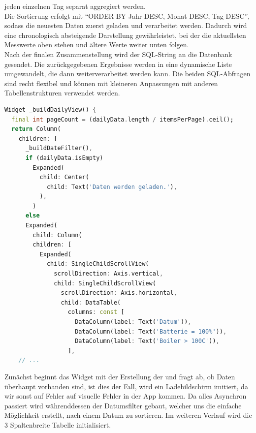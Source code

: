 \documentclass[11pt]{scrartcl}
\begin{document}
    jeden einzelnen Tag separat aggregiert werden. \\
    Die Sortierung erfolgt mit \enquote{ORDER BY Jahr DESC, Monat DESC, Tag DESC}, sodass die neuesten
    Daten zuerst geladen und verarbeitet werden.
    Dadurch wird eine chronologisch absteigende Darstellung gewährleistet, bei der die aktuellsten
    Messwerte oben stehen und ältere Werte weiter unten folgen. \\
    Nach der finalen Zusammenstellung wird der SQL-String an die Datenbank gesendet.
    Die zurückgegebenen Ergebnisse werden in eine dynamische Liste umgewandelt, die dann weiterverarbeitet werden kann.
    Die beiden SQL-Abfragen sind recht flexibel und können mit kleineren Anpassungen mit anderen
    Tabellenstrukturen verwendet werden.
    \begin{lstlisting}[language=Dart]
Widget _buildDailyView() {
  final int pageCount = (dailyData.length / itemsPerPage).ceil();
  return Column(
    children: [
      _buildDateFilter(),
      if (dailyData.isEmpty)
        Expanded(
          child: Center(
            child: Text('Daten werden geladen.'),
          ),
        )
      else
      Expanded(
        child: Column(
        children: [
          Expanded(
            child: SingleChildScrollView(
              scrollDirection: Axis.vertical,
              child: SingleChildScrollView(
                scrollDirection: Axis.horizontal,
                child: DataTable(
                  columns: const [
                    DataColumn(label: Text('Datum')),
                    DataColumn(label: Text('Batterie = 100%')),
                    DataColumn(label: Text('Boiler > 100C')),
                  ],
    // ...
    \end{lstlisting}
    Zunächst beginnt das Widget mit der Erstellung der und fragt ab, ob Daten überhaupt vorhanden sind, ist dies der Fall, wird ein Ladebildschirm imitiert,
    da wir sonst auf Fehler auf visuelle Fehler in der App kommen.
    Da alles Asynchron passiert wird währenddessen der Datumsfilter gebaut, welcher uns die einfache Möglichkeit erstellt,
    nach einem Datum zu sortieren.
    Im weiteren Verlauf wird die 3 Spaltenbreite Tabelle initialisiert.
\end{document}
